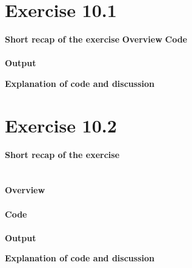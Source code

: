 \documentclass{article}
\newcommand\pythonstyle{\lstset{
language=python,
breaklines=true,
basicstyle=\ttfamily\small,
otherkeywords={1, 2, 3, 4, 5, 6, 7, 8 ,9 , 0, -, =, +, [, ], (, \), \{, \}, :, *, !},             %
keywordstyle=\color{blue},
emph={class, pass, in, for, while, if, is, elif, else, not, and, or, OR
    def, print, exec, break, continue, return},
emphstyle=\color{black}\bfseries,
emph={[2]True, False, None, self},
emphstyle=[2]\color{purple},
emph={[3]from, import, as},
emphstyle=[3]\color{blue},
stringstyle=\color{red},
frame=tb,
showstringspaces=false,
morecomment=[s]{"""}{"""},
commentstyle=\color{gray},
rulesepcolor=\color{blue},
title=\lstname
}}
\newcommand\pythonexternal[2][]{{
\pythonstyle
}}
\begin{document}
\section{Exercise 10.1}
\textbf{Short recap of the exercise}
\textit{}
\textbf{Overview}
\textbf{Code}\\
~\\
\textbf{Output}
\begin{pythonOutput}

\end{pythonOutput}
\textbf{Explanation of code and discussion}\\


\section{Exercise 10.2}
\textbf{Short recap of the exercise}\\
\textit{}\\
~\\
\textbf{Overview}\\

~\\
\textbf{Code}\\
~\\
\textbf{Output}
\begin{pythonOutput}

\end{pythonOutput}
\textbf{Explanation of code and discussion}\\

\end{document}
